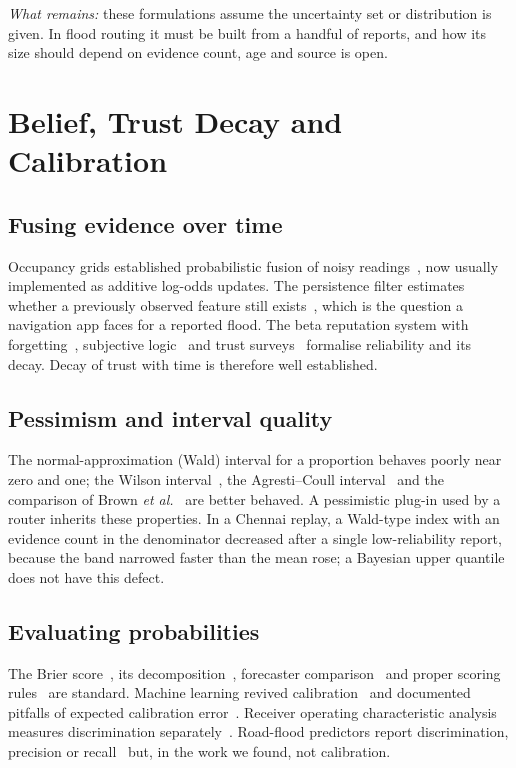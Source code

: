 \documentclass[journal]{IEEEtran}
\begin{document}
\emph{What remains:} these formulations assume the uncertainty set or distribution is given. In flood routing it must be built from a handful of reports, and how its size should depend on evidence count, age and source is open.

\section{Belief, Trust Decay and Calibration}\label{sec:belief}
\subsection{Fusing evidence over time}
Occupancy grids established probabilistic fusion of noisy readings~\cite{elfes1989occupancy}, now usually implemented as additive log-odds updates. The persistence filter estimates whether a previously observed feature still exists~\cite{rosen2016persistence}, which is the question a navigation app faces for a reported flood. The beta reputation system with forgetting~\cite{josang2002beta}, subjective logic~\cite{josang2001logic} and trust surveys~\cite{josang2007survey} formalise reliability and its decay. Decay of trust with time is therefore well established.

\subsection{Pessimism and interval quality}
The normal-approximation (Wald) interval for a proportion behaves poorly near zero and one; the Wilson interval~\cite{wilson1927probable}, the Agresti--Coull interval~\cite{agresti1998approximate} and the comparison of Brown \emph{et al.}~\cite{brown2001interval} are better behaved. A pessimistic plug-in used by a router inherits these properties. In a Chennai replay, a Wald-type index with an evidence count in the denominator decreased after a single low-reliability report, because the band narrowed faster than the mean rose; a Bayesian upper quantile does not have this defect.

\subsection{Evaluating probabilities}
The Brier score~\cite{brier1950verification}, its decomposition~\cite{murphy1973partition}, forecaster comparison~\cite{degroot1983forecasters} and proper scoring rules~\cite{gneiting2007scoring} are standard. Machine learning revived calibration~\cite{niculescu2005predicting,naeini2015bbq,guo2017calibration} and documented pitfalls of expected calibration error~\cite{nixon2019calibration}. Receiver operating characteristic analysis measures discrimination separately~\cite{fawcett2006roc}. Road-flood predictors report discrimination, precision or recall~\cite{yuan2022stgcn,yuan2023predicting,fan2020contagion} but, in the work we found, not calibration.
\end{document}
